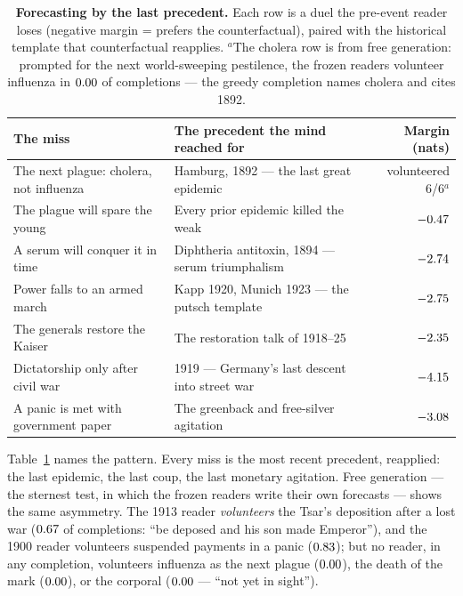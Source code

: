 \documentclass[11pt]{article}
\begin{document}
\begin{table}[t]\centering\small
\begin{tabular}{p{4.6cm}p{5.6cm}r}
\toprule
The miss & The precedent the mind reached for & Margin (nats) \\
\midrule
The next plague: cholera, not influenza & Hamburg, 1892 --- the last great epidemic \citep{evans1987} & volunteered 6/6$^{a}$ \\
The plague will spare the young & Every prior epidemic killed the weak & $-0.47$ \\
A serum will conquer it in time & Diphtheria antitoxin, 1894 --- serum triumphalism & $-2.74$ \\
Power falls to an armed march & Kapp 1920, Munich 1923 --- the putsch template & $-2.75$ \\
The generals restore the Kaiser & The restoration talk of 1918--25 & $-2.35$ \\
Dictatorship only after civil war & 1919 --- Germany's last descent into street war & $-4.15$ \\
A panic is met with government paper & The greenback and free-silver agitation & $-3.08$ \\
\bottomrule
\end{tabular}
\caption{\textbf{Forecasting by the last precedent.} Each row is a duel the pre-event reader loses (negative
margin = prefers the counterfactual), paired with the historical template that counterfactual reapplies.
$^{a}$The cholera row is from free generation: prompted for the next world-sweeping pestilence, the frozen
readers volunteer influenza in $0.00$ of completions --- the greedy completion names cholera and
cites 1892.}
\label{tab:analogy}
\end{table}

Table~\ref{tab:analogy} names the pattern. Every miss is the most recent precedent, reapplied: the last
epidemic, the last coup, the last monetary agitation. Free generation --- the sternest test, in which the
frozen readers write their own forecasts --- shows the same asymmetry. The 1913 reader \emph{volunteers} the
Tsar's deposition after a lost war ($0.67$ of completions: ``be deposed and his son made
Emperor''), and the 1900 reader volunteers suspended payments in a panic ($0.83$); but no
reader, in any completion, volunteers influenza as the next plague ($0.00$), the death of the
mark ($0.00$), or the corporal ($0.00$ --- ``not yet in sight'').
\end{document}
